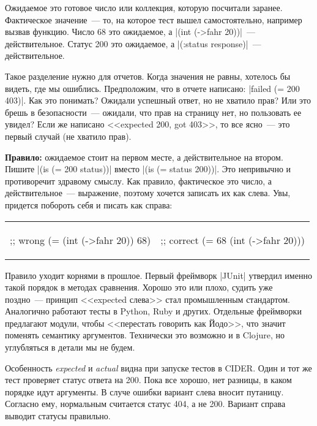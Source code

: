 Ожидаемое это готовое число или коллекция, которую посчитали
заранее. Фактическое значение~--- то, на которое тест вышел самостоятельно,
например вызвав функцию. Число 68 это ожидаемое, а \spverb|(int (->fahr 20))|~--- действительное.
Статус 200 это ожидаемое, а \spverb|(:status response)|~--- действительное.

Такое разделение нужно для отчетов. Когда значения не равны, хотелось бы видеть,
где мы ошиблись. Предположим, что в отчете написано: \spverb|failed (= 200 403)|.
Как это понимать? Ожидали успешный ответ, но не хватило прав? Или это брешь
в безопасности~--- ожидали, что прав на страницу нет, но пользовать ее увидел?
Если же написано <<expected 200, got 403>>, то все ясно~--- это первый случай
(не хватило прав).

\textbf{Правило:} ожидаемое стоит на первом месте, а действительное на
втором. Пишите \spverb|(is (= 200 status))| вместо \spverb|(is (= status 200))|.
Это непривычно и противоречит здравому смыслу. Как правило, фактическое это число,
а действительное~--- выражение, поэтому хочется записать их как слева.
Увы, придется побороть себя и писать как справа:

\noindent
\begin{tabular}{ @{}p{5cm} @{}p{5cm} }

\begin{english}
  \begin{clojure}
;; wrong
(= (int (->fahr 20)) 68)
  \end{clojure}
\end{english}

&

\begin{english}
  \begin{clojure}
;; correct
(= 68 (int (->fahr 20)))
  \end{clojure}
\end{english}

\end{tabular}

Правило уходит корнями в прошлое. Первый фреймворк \spverb|JUnit| утвердил
именно такой порядок в методах сравнения. Хорошо это или плохо, судить уже
поздно~--- принцип <<expected слева>> стал промышленным стандартом. Аналогично
работают тесты в Python, Ruby и других. Отдельные фреймворки предлагают модули,
чтобы <<перестать говорить как Йодо>>, что значит поменять семантику
аргументов. Технически это возможно и в Clojure, но углубляться в детали мы не
будем.

Особенность \emph{expected} и \emph{actual} видна при запуске тестов в
CIDER. Один и тот же тест проверяет статус ответа на 200. Пока все хорошо, нет
разницы, в каком порядке идут аргументы. В случе ошибки вариант слева вносит
путаницу. Согласно ему, нормальным считается статус 404, а не 200. Вариант
справа выводит статусы правильно.

